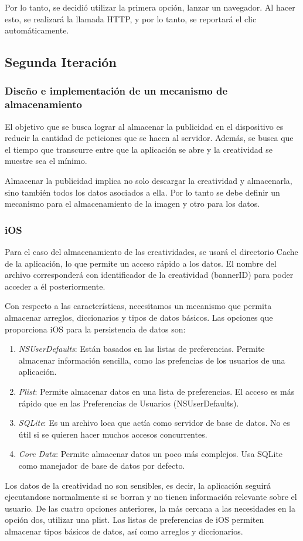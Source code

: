 Por lo tanto, se decidió utilizar la primera opción, lanzar un navegador.
Al hacer esto, se realizará la llamada HTTP, y por lo tanto, se reportará
el clic automáticamente.


\subsection{Segunda Iteración}


\subsubsection{Diseño e implementación de un mecanismo de almacenamiento}

El objetivo que se busca lograr al almacenar la publicidad en el dispositivo
es reducir la cantidad de peticiones que se hacen al servidor. Además,
se busca que el tiempo que transcurre entre que la aplicación se abre
y la creatividad se muestre sea el mínimo. 

Almacenar la publicidad implica no solo descargar la creatividad y
almacenarla, sino también todos los datos asociados a ella. Por lo
tanto se debe definir un mecanismo para el almacenamiento de la imagen
y otro para los datos. 


\subsubsection*{iOS}

Para el caso del almacenamiento de las creatividades, se usará el
directorio Cache de la aplicación, lo que permite un acceso rápido
a los datos. El nombre del archivo corresponderá con identificador
de la creatividad (bannerID) para poder acceder a él posteriormente.

Con respecto a las características, necesitamos un mecanismo que permita
almacenar arreglos, diccionarios y tipos de datos básicos. Las opciones
que proporciona iOS para la persistencia de datos son:
\begin{enumerate}
\item \textit{NSUserDefaults}: Están basados en las listas de preferencias.
Permite almacenar información sencilla, como las prefencias de los
usuarios de una aplicación. 
\item \textit{Plist}: Permite almacenar datos en una lista de preferencias.
El acceso es más rápido que en las Preferencias de Usuarios (NSUserDefaults). 
\item \textit{SQLite}: Es un archivo loca que actía como servidor de base
de datos. No es útil si se quieren hacer muchos accesos concurrentes.
\item \textit{Core Data}: Permite almacenar datos un poco más complejos.
Usa SQLite como manejador de base de datos por defecto. 
\end{enumerate}
Los datos de la creatividad no son sensibles, es decir, la aplicación
seguirá ejecutandose normalmente si se borran y no tienen información
relevante sobre el usuario. De las cuatro opciones anteriores, la
más cercana a las necesidades en la opción dos, utilizar una plist.
Las listas de preferencias de iOS permiten almacenar tipos básicos
de datos, así como arreglos y diccionarios.


